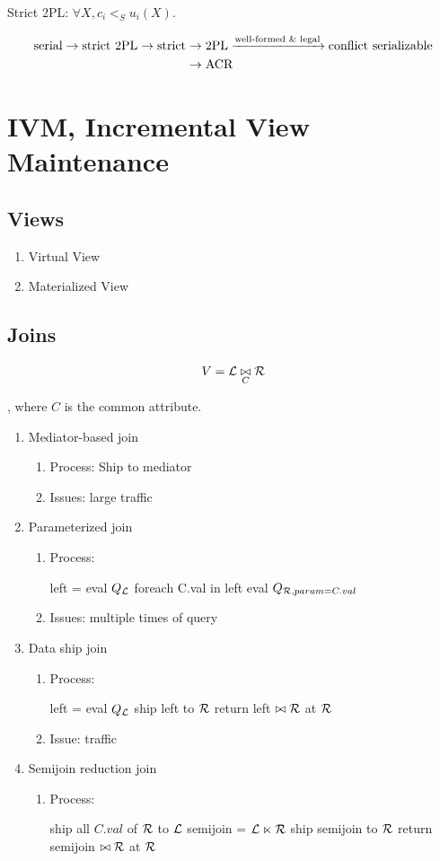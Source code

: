 \documentclass[a4paper]{report}
\begin{document}
Strict 2PL: $\forall X, c_i <_S u_i(X)$.

\begin{align*}
\text{serial} \rightarrow \text{strict 2PL} \rightarrow \text{strict} &\rightarrow \text{2PL} \xrightarrow{\text{well-formed \& legal}}\text{conflict serializable}\\
&\rightarrow \text{ACR}
\end{align*}
\chapter{IVM, Incremental View Maintenance}
\section{Views}
\begin{enumerate}
\item Virtual View
\item Materialized View
\end{enumerate}


\section{Joins}
$$
V = \mathcal{L} \underset{C}\bowtie \mathcal{R}
$$

, where $C$ is the common attribute.
\begin{enumerate}
\item Mediator-based join
\begin{enumerate}
\item Process: Ship to mediator
\item Issues: large traffic
\end{enumerate}
\item Parameterized join
\begin{enumerate}
\item Process:
\begin{pseudo}
left = eval $Q_{\mathcal{L}}$
foreach C.val in left
  eval $Q_{\mathcal{R}, param=C.val}$
\end{pseudo}
\item Issues: multiple times of query
\end{enumerate}
\item Data ship join
\begin{enumerate}
\item Process:
\begin{pseudo}
left = eval $Q_{\mathcal{L}}$
ship left to $\mathcal{R}$
return left $\bowtie \mathcal{R}$ at $\mathcal{R}$
\end{pseudo}
\item Issue: traffic
\end{enumerate}
\item Semijoin reduction join
\begin{enumerate}
\item Process:
\begin{pseudo}
ship all $C.val$ of $\mathcal{R}$ to $\mathcal{L}$
semijoin = $\mathcal{L} \ltimes \mathcal{R}$
ship semijoin to $\mathcal{R}$
return semijoin $\bowtie \mathcal{R}$ at $\mathcal{R}$
\end{pseudo}
\end{enumerate}
\end{enumerate}
\end{document}
